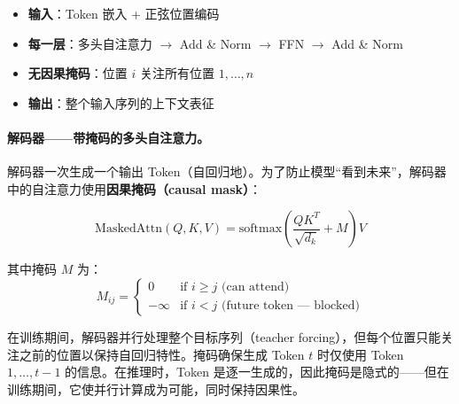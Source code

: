 \begin{itemize}
  \item \textbf{输入}：Token 嵌入 + 正弦位置编码
  \item \textbf{每一层}：多头自注意力 $\to$ Add \& Norm $\to$ FFN $\to$ Add \& Norm
  \item \textbf{无因果掩码}：位置 $i$ 关注所有位置 $1, \ldots, n$
  \item \textbf{输出}：整个输入序列的上下文表征
\end{itemize}

\paragraph{解码器——带掩码的多头自注意力。}
\label{decoder-masked-multi-head-self-attention.}

解码器一次生成一个输出 Token（自回归地）。为了防止模型``看到未来''，解码器中的自注意力使用\textbf{因果掩码（causal mask）}：

\begin{equation}
  \text{MaskedAttn}(Q, K, V) = \text{softmax}\!\left(\frac{QK^T}{\sqrt{d_k}} + M\right) V
\end{equation}

其中掩码 $M$ 为：
\[
M_{ij} = \begin{cases} 0 & \text{if } i \geq j \text{ (can attend)} \\ -\infty & \text{if } i < j \text{ (future token --- blocked)} \end{cases}
\]

\begin{intuitionbox}[为什么掩码很重要]
在训练期间，解码器并行处理整个目标序列（teacher forcing），但每个位置只能关注之前的位置以保持自回归特性。掩码确保生成 Token $t$ 时仅使用 Token $1, \ldots, t{-}1$ 的信息。在推理时，Token 是逐一生成的，因此掩码是隐式的——但在训练期间，它使并行计算成为可能，同时保持因果性。
\end{intuitionbox}

